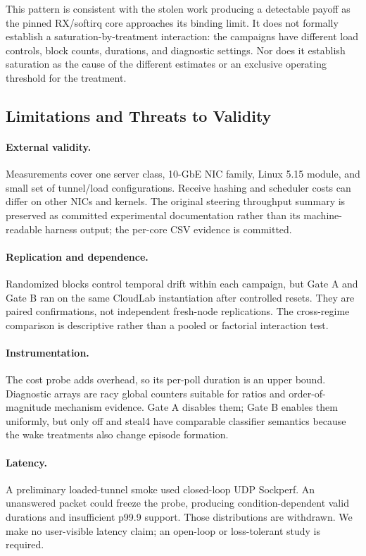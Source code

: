 This pattern is consistent with the stolen work producing a detectable payoff
as the pinned RX/softirq core approaches its binding limit.  It does not
formally establish a saturation-by-treatment interaction: the campaigns have
different load controls, block counts, durations, and diagnostic settings.
Nor does it establish saturation as the cause of the different estimates or
an exclusive operating threshold for the treatment.

\subsection{Limitations and Threats to Validity}
\label{sec:eval-limitations}

\paragraph{External validity.}
Measurements cover one server class, 10-GbE NIC family, Linux 5.15 module, and
small set of tunnel/load configurations.  Receive hashing and scheduler costs
can differ on other NICs and kernels.  The original steering throughput
summary is preserved as committed experimental documentation rather than its
machine-readable harness output; the per-core CSV evidence is committed.

\paragraph{Replication and dependence.}
Randomized blocks control temporal drift within each campaign, but Gate A and
Gate B ran on the same CloudLab instantiation after controlled resets.  They
are paired confirmations, not independent fresh-node replications.  The
cross-regime comparison is descriptive rather than a pooled or factorial
interaction test.

\paragraph{Instrumentation.}
The cost probe adds overhead, so its per-poll duration is an upper bound.
Diagnostic arrays are racy global counters suitable for ratios and
order-of-magnitude mechanism evidence.  Gate A disables them; Gate B enables
them uniformly, but only off and steal4 have comparable classifier semantics
because the wake treatments also change episode formation.

\paragraph{Latency.}
A preliminary loaded-tunnel smoke used closed-loop UDP Sockperf.  An unanswered
packet could freeze the probe, producing condition-dependent valid durations
and insufficient p99.9 support.  Those distributions are withdrawn.  We make
no user-visible latency claim; an open-loop or loss-tolerant study is required.

